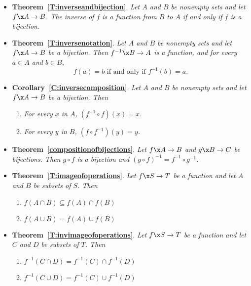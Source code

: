 \begin{itemize}
\item \textbf{Theorem~\ref{T:inverseandbijection}}.
\emph{Let  $A$  and  $B$  be nonempty sets and let  $f\x A \to B$.  The inverse of  $f$ is a function from  $B$  to  $A$  if and only if  $f$  is a bijection.}

\item \textbf{Theorem~\ref{T:inversenotation}}.
\emph{Let  $A$  and  $B$  be nonempty sets and let  $f\x A \to B$  be a bijection.  Then 
$f^{ - 1} \x B \to A$ is a function, and for every  $a \in A$ and $b \in B$,}
\[
f( a ) = b  \text{ if and only if } f^{ - 1} ( b ) = a.
\]

\item \textbf{Corollary~\ref{C:inversecomposition}}.
\emph{Let  $A$  and  $B$  be nonempty sets and let  $f\x A \to B$  be a bijection.  Then}
\begin{enumerate}
\item \emph{For every $x$ in $A$, $( f^{ - 1}  \circ f )(x) = x$.}
\item \emph{For every $y$ in $B$, $( f \circ f^{ - 1})(y) = y$.}
\end{enumerate}

\item \textbf{Theorem~\ref{compositionofbijections}}.
\emph{Let $f\x A \to B$  and  $g\x B \to C$  be bijections.  Then  $g \circ f$  is a bijection and  $( {g \circ f} )^{ - 1}  = f^{ - 1}  \circ g^{ - 1} $.}


\item \textbf{Theorem~\ref{T:imageofoperations}}.
\emph{Let $f\x S \to T$ be a function and let $A$ and $B$ be subsets of $S$.  Then}
\begin{enumerate}
\item $f ( A \cap B ) \subseteq f ( A ) \cap f ( B )$
%

\item $f ( A \cup B ) = f ( A ) \cup f ( B )$
%
\end{enumerate}

\item \textbf{Theorem~\ref{T:invimageofoperations}}.
\emph{Let $f\x S \to T$ be a function and let $C$ and $D$ be subsets of $T$.  Then}
\begin{enumerate}
\item $f^{-1} ( C \cap D ) = f^{-1} ( C ) \cap f^{-1} ( D )$
%

\item $f^{-1} ( C \cup D ) = f^{-1} ( C ) \cup f^{-1} ( D )$
%
\end{enumerate}



\end{itemize}
